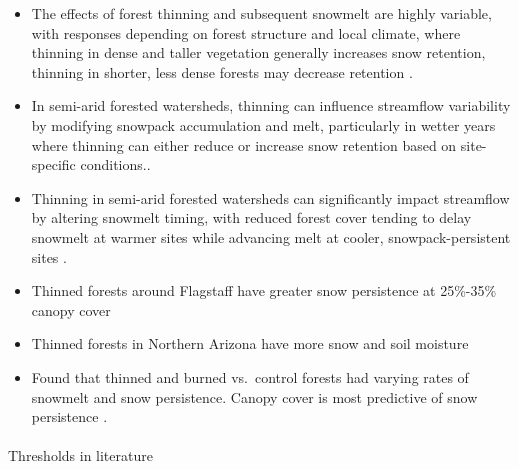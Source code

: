 \documentclass[
  number]{elsarticle}
\makeatletter
\let\oldparagraph\paragraph
\renewcommand{\paragraph}{
    \@ifstar
      \xxxParagraphStar
      \xxxParagraphNoStar
  }
\newcommand{\xxxParagraphStar}[1]{\oldparagraph*{#1}\mbox{}}
\newcommand{\xxxParagraphNoStar}[1]{\oldparagraph{#1}\mbox{}}
\makeatother
\begin{document}
\begin{itemize}
\item
  The effects of forest thinning and subsequent snowmelt are highly
  variable, with responses depending on forest structure and local
  climate, where thinning in dense and taller vegetation generally
  increases snow retention, thinning in shorter, less dense forests may
  decrease retention \citep{lewis_prediction_2023}.
\item
  In semi-arid forested watersheds, thinning can influence streamflow
  variability by modifying snowpack accumulation and melt, particularly
  in wetter years where thinning can either reduce or increase snow
  retention based on site-specific
  conditions.\citep{broxton_subseasonal_2023}.
\item
  Thinning in semi-arid forested watersheds can significantly impact
  streamflow by altering snowmelt timing, with reduced forest cover
  tending to delay snowmelt at warmer sites while advancing melt at
  cooler, snowpack-persistent sites \citep{dwivedi_how_2024}.
\item
  Thinned forests around Flagstaff have greater snow persistence at
  25\%-35\% canopy cover \citep{belmonte_uav-based_2021}
\item
  Thinned forests in Northern Arizona have more snow and soil moisture
  \citep{odonnell_vegetation_2021}
\item
  Found that thinned and burned vs.~control forests had varying rates of
  snowmelt and snow persistence. Canopy cover is most predictive of snow
  persistence \citep{donager_integrating_2021}.
\end{itemize}

\paragraph{Thresholds in literature}\label{thresholds-in-literature}
\end{document}
